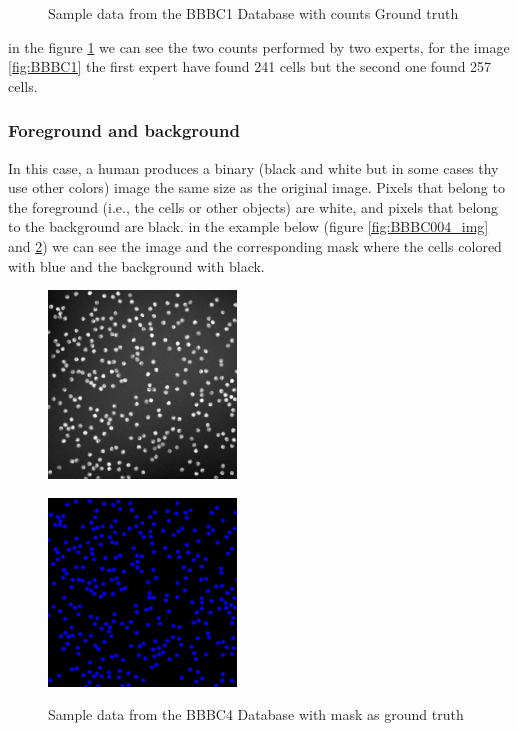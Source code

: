 {\begin{figure}[H]
\begin{minipage}[c]{\linewidth}
\centering

\label{fig:BBBC001_Counts}
\end{minipage}
\caption{Sample data from the BBBC1 Database with counts Ground truth}
\end{figure}

in the figure \ref{fig:BBBC001_Counts} we can see the two counts performed by two experts, for the image \ref{fig:BBBC1} the first expert have found 241 cells but the second one found 257 cells.

\subsubsection{Foreground and background}
\hspace{\parindent}
In this case, a human produces a binary (black and white but in some cases thy use other colors) image the same size as the original image. Pixels that belong to the foreground (i.e., the cells or other objects) are white, and pixels that belong to the background are black. in the example below (figure \ref{fig:BBBC004_img} and \ref{fig:BBBC004_F}) we can see the image and the corresponding mask where the cells colored with blue and the background with black.

\begin{figure}[H]
\begin{minipage}[c]{0.4\linewidth}
\centering
\includegraphics[width=50mm]{../images/BBBC4-1.jpg}
\label{fig:BBBC004_img}
\end{minipage}
\hfill
\begin{minipage}[c]{0.4\linewidth}
\centering
\includegraphics[width=50mm]{../images/BBBC4-1-F.jpg}
\label{fig:BBBC004_F}
\end{minipage}
\caption{Sample data from the BBBC4 Database with mask as ground truth}
\end{figure}

}
